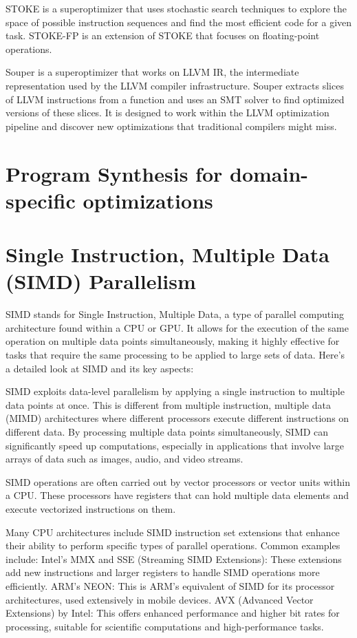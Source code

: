 STOKE is a superoptimizer that uses stochastic search techniques to
explore the space of possible instruction sequences and find the most
efficient code for a given task. STOKE-FP is an extension of STOKE
that focuses on floating-point operations.

Souper is a superoptimizer that works on LLVM IR, the intermediate
representation used by the LLVM compiler infrastructure. Souper
extracts slices of LLVM instructions from a function and uses an SMT
solver to find optimized versions of these slices. It is designed to
work within the LLVM optimization pipeline and discover new
optimizations that traditional compilers might miss.


\section {Program Synthesis for domain-specific optimizations}




\section{Single Instruction, Multiple Data (SIMD) Parallelism}
\label{sec:simd}

SIMD stands for Single Instruction, Multiple Data, a type of parallel
computing architecture found within a CPU or GPU. It allows for the
execution of the same operation on multiple data points
simultaneously, making it highly effective for tasks that require the
same processing to be applied to large sets of data. Here's a detailed
look at SIMD and its key aspects:

SIMD exploits data-level parallelism by applying a single instruction
to multiple data points at once. This is different from multiple
instruction, multiple data (MIMD) architectures where different
processors execute different instructions on different data. By
processing multiple data points simultaneously, SIMD can significantly
speed up computations, especially in applications that involve large
arrays of data such as images, audio, and video streams.

SIMD operations are often carried out by vector processors or vector
units within a CPU. These processors have registers that can hold
multiple data elements and execute vectorized instructions on them.

Many CPU architectures include SIMD instruction set extensions that
enhance their ability to perform specific types of parallel
operations. Common examples include: Intel’s MMX and SSE (Streaming
SIMD Extensions): These extensions add new instructions and larger
registers to handle SIMD operations more efficiently. ARM’s NEON: This
is ARM’s equivalent of SIMD for its processor architectures, used
extensively in mobile devices. AVX (Advanced Vector Extensions) by
Intel: This offers enhanced performance and higher bit rates for
processing, suitable for scientific computations and high-performance
tasks.

